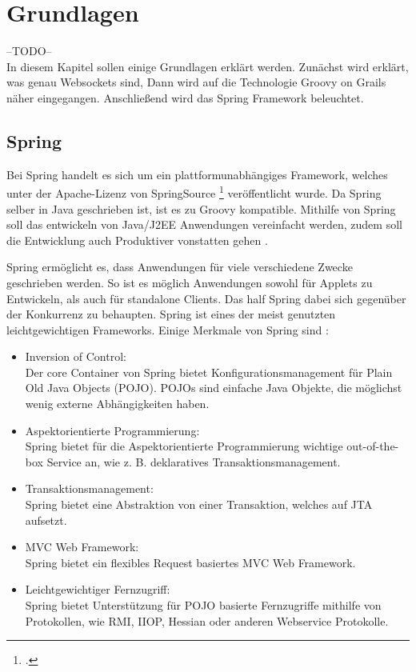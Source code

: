 
\section{Grundlagen}

--TODO--\\
In diesem Kapitel sollen einige Grundlagen erklärt werden. Zunächst wird erklärt, was genau Websockets sind, Dann wird auf die Technologie Groovy on Grails näher eingegangen. Anschließend wird das Spring Framework beleuchtet.

\subsection{Spring}

Bei Spring handelt es sich um ein plattformunabhängiges Framework, welches unter der Apache-Lizenz von  SpringSource \footcite{https://spring.io/} veröffentlicht wurde. Da Spring selber in Java geschrieben ist, ist es zu Groovy kompatible. Mithilfe von Spring soll das entwickeln von Java/J2EE Anwendungen vereinfacht werden, zudem soll die Entwicklung auch Produktiver vonstatten gehen \cite[Seite 1]{johnson2005}. 

Spring ermöglicht es, dass Anwendungen für viele verschiedene Zwecke geschrieben werden. So ist es möglich Anwendungen sowohl für Applets zu Entwickeln, als auch für standalone Clients. Das half Spring dabei sich gegenüber der Konkurrenz zu behaupten. Spring ist eines der meist genutzten leichtgewichtigen Frameworks. 
Einige Merkmale von Spring sind \cite[Seite 5]{johnson2005}:

\begin{itemize}
\item Inversion of Control:\\ Der core Container von Spring bietet Konfigurationsmanagement für Plain Old Java Objects (POJO). POJOs sind einfache Java Objekte, die möglichst wenig externe Abhängigkeiten haben. 
\\
\item Aspektorientierte Programmierung:\\ Spring bietet für die Aspektorientierte Programmierung wichtige out-of-the-box Service an, wie z. B. deklaratives Transaktionsmanagement.
\\
\item Transaktionsmanagement:\\ Spring bietet eine Abstraktion von einer Transaktion, welches auf \ac{JTA} aufsetzt.
\\
\item MVC Web Framework:\\ Spring bietet ein flexibles Request basiertes MVC Web Framework. 
\\
\item Leichtgewichtiger Fernzugriff:\\ Spring bietet Unterstützung für POJO basierte Fernzugriffe mithilfe von Protokollen, wie RMI, IIOP, Hessian oder anderen Webservice Protokolle.
\end{itemize}

